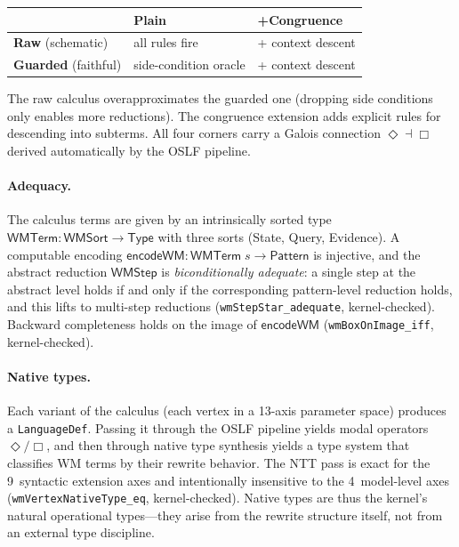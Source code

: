 \documentclass[11pt,openany]{report}
\begin{document}
\begin{center}
\begin{tabular}{lll}
\toprule
& \textbf{Plain} & \textbf{+Congruence} \\
\midrule
\textbf{Raw} (schematic) & all rules fire & + context descent \\
\textbf{Guarded} (faithful) & side-condition oracle & + context descent \\
\bottomrule
\end{tabular}
\end{center}

\noindent
The raw calculus overapproximates the guarded one (dropping side conditions
only enables more reductions).  The congruence extension adds explicit rules
for descending into subterms.  All four corners carry a Galois connection
$\Diamond \dashv \Box$ derived automatically by the OSLF pipeline.

\paragraph{Adequacy.}
The calculus terms are given by an intrinsically sorted type
$\mathsf{WMTerm} : \mathsf{WMSort} \to \mathsf{Type}$ with three sorts
(State, Query, Evidence).  A computable encoding
$\mathsf{encodeWM} : \mathsf{WMTerm}\;s \to \mathsf{Pattern}$ is
injective, and the abstract reduction $\mathsf{WMStep}$ is
\emph{biconditionally adequate}: a single step at the abstract level
holds if and only if the corresponding pattern-level reduction holds, and
this lifts to multi-step reductions
(\texttt{wmStepStar\_adequate}, kernel-checked).
Backward completeness holds on the image of $\mathsf{encodeWM}$
(\texttt{wmBoxOnImage\_iff}, kernel-checked).

\paragraph{Native types.}
Each variant of the calculus (each vertex in a 13-axis parameter space)
produces a \texttt{LanguageDef}.  Passing it through the OSLF pipeline
yields modal operators $\Diamond/\Box$, and then through native type
synthesis yields a type system that classifies WM terms by their rewrite
behavior.  The NTT pass is exact for the 9~syntactic extension axes and
intentionally insensitive to the 4~model-level axes
(\texttt{wmVertexNativeType\_eq}, kernel-checked).  Native types are thus
the kernel's natural operational types---they arise from the rewrite
structure itself, not from an external type discipline.
\end{document}
